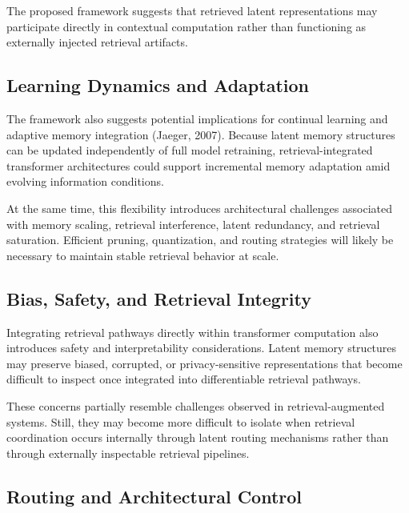 \documentclass[
]{article}
\begin{document}
The proposed framework suggests that retrieved latent representations
may participate directly in contextual computation rather than
functioning as externally injected retrieval artifacts.

\hypertarget{learning-dynamics-and-adaptation}{%
\subsection{\texorpdfstring{ Learning Dynamics and
Adaptation}{ Learning Dynamics and Adaptation}}\label{learning-dynamics-and-adaptation}}

The framework also suggests potential implications for continual
learning and adaptive memory integration (Jaeger, 2007). Because latent
memory structures can be updated independently of full model retraining,
retrieval-integrated transformer architectures could support incremental
memory adaptation amid evolving information conditions.

At the same time, this flexibility introduces architectural challenges
associated with memory scaling, retrieval interference, latent
redundancy, and retrieval saturation. Efficient pruning, quantization,
and routing strategies will likely be necessary to maintain stable
retrieval behavior at scale.

\hypertarget{bias-safety-and-retrieval-integrity}{%
\subsection{\texorpdfstring{ Bias, Safety, and Retrieval
Integrity}{ Bias, Safety, and Retrieval Integrity}}\label{bias-safety-and-retrieval-integrity}}

Integrating retrieval pathways directly within transformer computation
also introduces safety and interpretability considerations. Latent
memory structures may preserve biased, corrupted, or privacy-sensitive
representations that become difficult to inspect once integrated into
differentiable retrieval pathways.

These concerns partially resemble challenges observed in
retrieval-augmented systems. Still, they may become more difficult to
isolate when retrieval coordination occurs internally through latent
routing mechanisms rather than through externally inspectable retrieval
pipelines.

\hypertarget{routing-and-architectural-control}{%
\subsection{\texorpdfstring{ Routing and Architectural
Control}{ Routing and Architectural Control}}\label{routing-and-architectural-control}}
\end{document}
